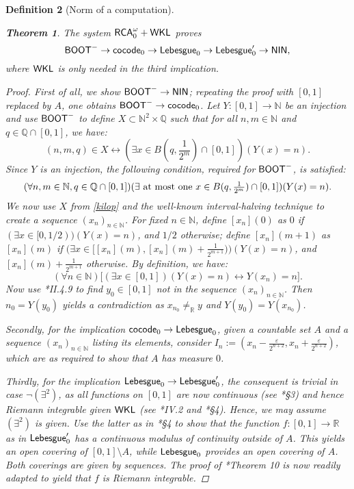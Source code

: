 \documentclass[reqno]{amsart}
\newtheorem{thm}{Theorem}
\newtheorem{defi}[thm]{Definition}
\newcommand\be{\begin{equation}}
\newcommand\ee{\end{equation}}
\def\RCAo{\textup{\textsf{RCA}}_{0}^{\omega}}
\def\WKL{\textup{\textsf{WKL}}}
\def\N{{\mathbb  N}}
\def\Q{{\mathbb  Q}}
\def\R{{\mathbb  R}}
\def\di{\rightarrow}
\def\asa{\leftrightarrow}
\def\LEB{\textup{\textsf{Lebesgue}}}
\def\cocode{\textup{\textsf{cocode}}}
\def\NIN{\textup{\textsf{NIN}}}
\def\BOOT{\textup{\textsf{BOOT}}}
\def\eps{\varepsilon}
\numberwithin{equation}{section}
\numberwithin{thm}{section}
\begin{document}
\begin{defi}[Norm of a computation]
\begin{thm}\label{kloothommel}
The system $\RCAo+\WKL$ proves 
\be\label{cahoot}
\BOOT^{-}\di \cocode_{0}\di  \LEB_{0} \di \LEB_{0}'\di \NIN,
\ee
where $\WKL$ is only needed in the third implication. 
\end{thm}
\begin{proof}
First of all, we show $\BOOT^{-}\di \NIN$; repeating the proof with $[0,1]$ replaced by $A$, one obtains $\BOOT^{-}\di \cocode_{0}$.  
Let $Y:[0,1]\di \N$ be an injection and use $\BOOT^{-}$ to define $X\subset \N^{2}\times \Q$ such that for all $n, m\in \N$ and $q\in \Q\cap [0,1]$, we have:
\be\label{kilop}\textstyle
(n, m, q)\in X\asa (\exists x\in B(q, \frac{1}{2^{m}})\cap [0,1])(Y(x)= n ).
\ee
Since $Y$ is an injection, the following condition, required for $\BOOT^{-}$, is satisfied: 
\[\textstyle
(\forall n, m\in \N, q\in \Q\cap [0,1])(\exists \textup{ at most one } x\in B(q, \frac{1}{2^{m}})\cap [0,1])(Y(x)= n ).
\]
We now use $X$ from \eqref{kilop} and the well-known interval-halving technique to create a sequence $(x_{n})_{n\in \N}$.  
For fixed $n\in \N$, define $[x_{n}](0)$ as $0$ if $(\exists x\in [0, 1/2))(Y(x)=n)$, and $1/2$ otherwise; define $[x_{n}](m+1)$ as $[x_{n}](m)$ if $(\exists x\in \big[[x_{n}](m), [x_{n}](m)+\frac{1}{2^{m+1}}\big)\big)(Y(x)=n)$, and $[x_{n}](m)+\frac{1}{2^{m+1}}$ otherwise.  By definition, we have:  %
\[
(\forall n\in \N)\big[(\exists x\in [0,1])(Y(x)=n)\asa  Y(x_{n})=n \big].
\]
Now use \cite{simpson2}*{II.4.9} to find $y_{0}\in [0,1]$ not in the sequence $(x_{n})_{n\in \N}$.
Then $n_{0}=Y(y_{0})$ yields a contradiction as $x_{n_{0}}\ne_{\R} y $ and $Y(y_{0})=Y(x_{n_{0}})$.

\smallskip

Secondly, for the implication $\cocode_{0} \di \LEB_{0}$, given a countable set $A$ and a sequence $(x_n)_{n\in \N}$ listing its elements, consider $I_{n}:= (x_{n}-\frac{\eps}{2^{n+2}}, x_{n}+\frac{\eps}{2^{n+2}})$, which 
are as required to show that $A$ has measure $0$.  

\smallskip

Thirdly, for the implication $ \LEB_{0}\di \LEB_{0}'$, the consequent is trivial in case $\neg(\exists^{2})$, as all functions on $[0,1]$ are now continuous (see \cite{kohlenbach2}*{\S3}) and hence Riemann integrable given $\WKL$ (see \cite{simpson2}*{IV.2} and \cite{kohlenbach4}*{\S4}).  Hence, we may assume $(\exists^{2})$ is given.  Use the latter as in \cite{kohlenbach4}*{\S4} to show that the function $f:[0,1]\di \R$ as in $\LEB_{0}'$ has a continuous modulus of continuity outside of $A$.
This yields an open covering of $[0,1]\setminus A$, while $\LEB_{0}$ provides an open covering of $A$.
Both coverings are given by sequences.  The proof of \cite{sayo}*{Theorem 10} is now readily adapted to yield that $f$ is Riemann integrable.


\end{proof}
\end{defi}
\end{document}
